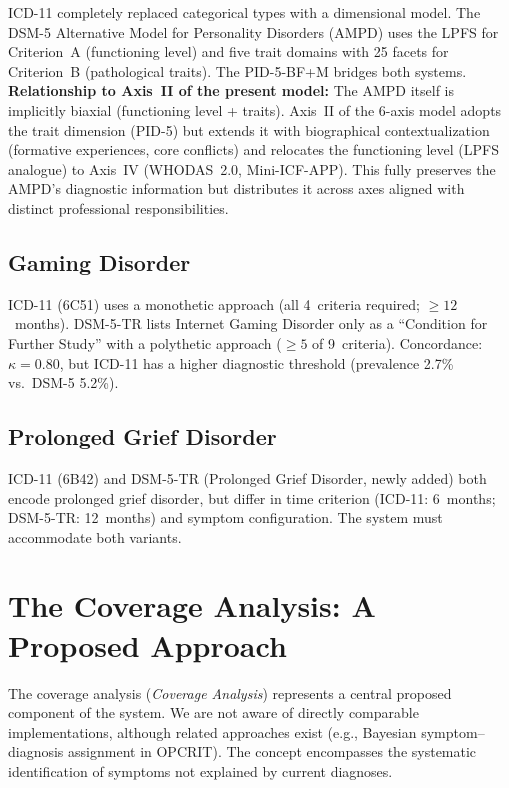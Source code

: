 \documentclass[11pt,a4paper]{article}
\begin{document}
ICD-11 completely replaced categorical types with a dimensional model. The DSM-5 Alternative Model for Personality Disorders (AMPD) uses the LPFS for Criterion~A (functioning level) and five trait domains with 25 facets for Criterion~B (pathological traits). The PID-5-BF+M bridges both systems. \textbf{Relationship to Axis~II of the present model:} The AMPD itself is implicitly biaxial (functioning level + traits). Axis~II of the 6-axis model adopts the trait dimension (PID-5) but extends it with biographical contextualization (formative experiences, core conflicts) and relocates the functioning level (LPFS analogue) to Axis~IV (WHODAS~2.0, Mini-ICF-APP). This fully preserves the AMPD's diagnostic information but distributes it across axes aligned with distinct professional responsibilities.

\subsection{Gaming Disorder}

ICD-11 (6C51) uses a monothetic approach (all 4~criteria required; $\geq 12$~months). DSM-5-TR lists Internet Gaming Disorder only as a ``Condition for Further Study'' with a polythetic approach ($\geq 5$ of 9~criteria). Concordance: $\kappa = 0.80$, but ICD-11 has a higher diagnostic threshold (prevalence 2.7\% vs.\ DSM-5 5.2\%).

\subsection{Prolonged Grief Disorder}

ICD-11 (6B42) and DSM-5-TR (Prolonged Grief Disorder, newly added) both encode prolonged grief disorder, but differ in time criterion (ICD-11: 6~months; DSM-5-TR: 12~months) and symptom configuration. The system must accommodate both variants.

\section{The Coverage Analysis: A Proposed Approach}
\label{sec:coverage}

The coverage analysis (\textit{Coverage Analysis}) represents a central proposed component of the system. We are not aware of directly comparable implementations, although related approaches exist (e.g., Bayesian symptom--diagnosis assignment in OPCRIT). The concept encompasses the systematic identification of symptoms not explained by current diagnoses.
\end{document}
